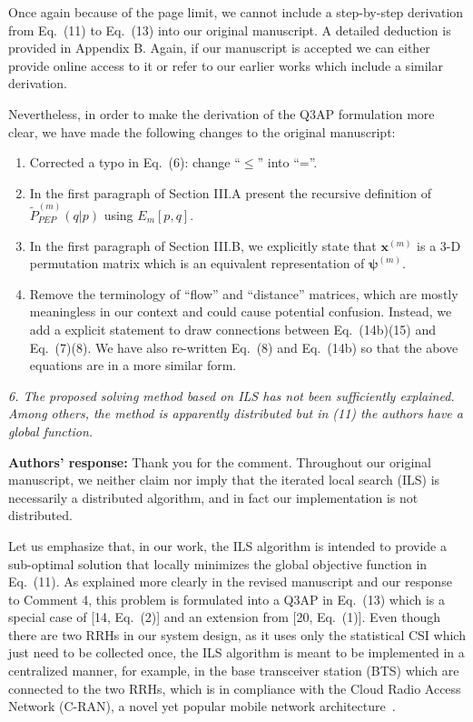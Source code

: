 \documentclass[onecolumn, 11pt, draftclsnofoot]{IEEEtran}
\begin{document}
Once again because of the page limit, we cannot include a step-by-step
derivation from Eq.~(11) to Eq.~(13) into our original manuscript. A detailed
deduction is provided in Appendix B. Again, if our manuscript is accepted we
can either provide online access to it or refer to our earlier
works which include a similar derivation.

Nevertheless, in order to make the derivation of the Q3AP formulation more
clear, we have made the following changes to the original manuscript:
\begin{enumerate}
  \item Corrected a typo in Eq.~(6): change ``$\leq$'' into ``=''.
  \item In the first paragraph of Section III.A present the recursive definition
  of $\tilde{P}_{PEP}^{(m)}(q|p)$ using $E_m[p,q]$.
  \item In the first paragraph of Section III.B, we explicitly state that
  $\mathbf{x}^{(m)}$ is a 3-D permutation matrix which is an equivalent
  representation of $\bm{\psi}^{(m)}$.
  \item Remove the terminology of ``flow'' and ``distance'' matrices, which are
  mostly meaningless in our context and could cause potential confusion.
  Instead, we add a explicit statement to draw connections between Eq.~(14b)(15)
  and Eq.~(7)(8). We have also re-written Eq.~(8) and Eq.~(14b) so that the
  above equations are in a more similar form.
\end{enumerate}

\vspace{0.5cm}

\noindent
\emph{6. The proposed solving method based on ILS has not been sufficiently
explained. Among others, the method is apparently distributed but in (11) the
authors have a global function.}

\noindent \textbf{Authors' response:}
Thank you for the comment. Throughout our original manuscript, we neither claim
nor imply that the iterated local search (ILS) is necessarily a distributed
algorithm, and in fact our implementation is not distributed.

Let us emphasize that, in our work, the ILS algorithm is intended to provide a
sub-optimal solution that locally minimizes the global objective function in
Eq.~(11). As explained more clearly in the revised manuscript and our response
to Comment 4, this problem is formulated into a Q3AP in Eq.~(13) which is a
special case of [14, Eq.~(2)] and an extension from [20, Eq.~(1)]. Even though
there are two RRHs in our system design, as it uses only the statistical CSI
which just need to be collected once, the ILS algorithm is meant to be
implemented in a centralized manner, for example, in the base transceiver
station (BTS) which are connected to the two RRHs, which is in compliance with
the Cloud Radio Access Network (C-RAN), a novel yet popular mobile network
architecture~\citep[R][]{6897914}.
\end{document}
